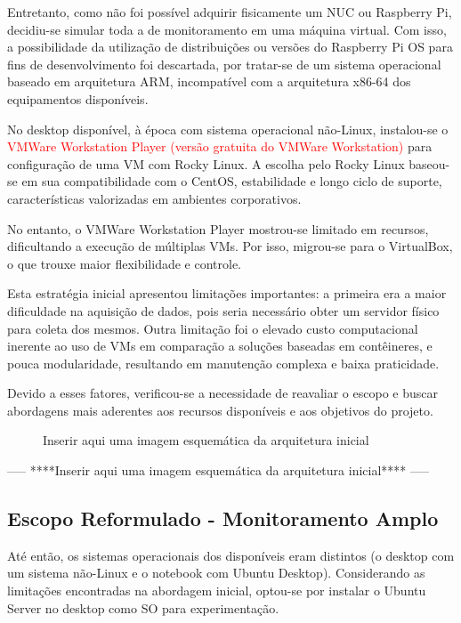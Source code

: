 Entretanto, como não foi possível adquirir fisicamente um NUC ou Raspberry Pi, decidiu-se simular toda a  de monitoramento em uma máquina virtual. Com isso, a possibilidade da utilização de distribuições ou versões do Raspberry Pi OS para fins de desenvolvimento foi descartada, por tratar-se de um sistema operacional baseado em arquitetura ARM, incompatível com a arquitetura x86-64 dos equipamentos disponíveis.

No desktop disponível, à época com sistema operacional não-Linux, instalou-se o \textcolor{red}{VMWare Workstation Player (versão gratuita do VMWare Workstation)} para configuração de uma VM com Rocky Linux. A escolha pelo Rocky Linux baseou-se em sua compatibilidade com o CentOS, estabilidade e longo ciclo de suporte, características valorizadas em ambientes corporativos.

No entanto, o VMWare Workstation Player mostrou-se limitado em recursos, dificultando a execução de múltiplas VMs. Por isso, migrou-se para o VirtualBox, o que trouxe maior flexibilidade e controle.

Esta estratégia inicial apresentou limitações importantes: a primeira era a maior dificuldade na aquisição de dados, pois seria necessário obter um servidor físico para coleta dos mesmos. Outra limitação foi o elevado custo computacional inerente ao uso de VMs em comparação a soluções baseadas em contêineres, e pouca modularidade, resultando em manutenção complexa e baixa praticidade.

Devido a esses fatores, verificou-se a necessidade de reavaliar o escopo e buscar abordagens mais aderentes aos recursos disponíveis e aos objetivos do projeto.

\begin{figure}[H]
\centering
\fbox{\rule{0pt}{150pt} \rule{200pt}{0pt}} %
\caption{Inserir aqui uma imagem esquemática da arquitetura inicial}
\label{fig:placeholder}
\end{figure}

-----
****Inserir aqui uma imagem esquemática da arquitetura inicial****
-----

\subsection{Escopo Reformulado - Monitoramento Amplo}
\label{subsection:EscopoReformulado}

Até então, os sistemas operacionais dos  disponíveis eram distintos (o desktop com um sistema não-Linux e o notebook com Ubuntu Desktop). Considerando as limitações encontradas na abordagem inicial, optou-se por instalar o Ubuntu Server no desktop como SO para experimentação.

